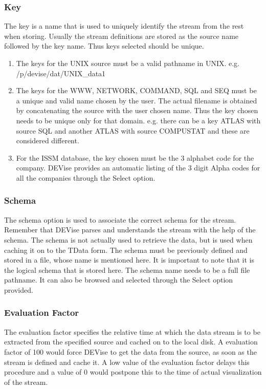 \subsubsection{Key}

The key is a name that is used to uniquely identify the stream from the rest
when storing. Usually the stream definitions are stored as the source name
followed by the key name. Thus keys selected should be unique.

\begin{enumerate}
\item
The keys for the UNIX source must be a valid pathname in UNIX.
e.g. /p/devise/dat/UNIX\_data1

\item
The keys for the WWW, NETWORK, COMMAND, SQL and SEQ must be a unique and valid
name chosen by the user. The actual filename is obtained by concatenating the
source with the user chosen name. Thus the key chosen needs to be unique only
for that domain. e.g. there can be a key ATLAS with source SQL and another ATLAS
with source COMPUSTAT and these are considered different.

\item
For the ISSM database, the key chosen must be the 3 alphabet code for the
company. DEVise provides an automatic listing of the 3 digit Alpha codes for all
the companies through the Select option.
\end{enumerate}

\subsubsection{Schema}

The schema option is used to associate the correct schema for the stream.
Remember that DEVise parses and understands the stream with the help of the
schema. The schema is not actually used to retrieve the data, but is used when
caching it on to the TData form. The schema must be previously defined and
stored in a file, whose name is mentioned here. It is important to note that it
is the logical schema that is stored here. The schema name needs to be a full
file pathname. It can also be browsed and selected through the Select option
provided.

\subsubsection{Evaluation Factor}

The evaluation factor specifies the relative time at which the data stream is to
be extracted from the specified source and cached on to the local disk. A
evaluation factor of 100 would force DEVise to get the data from the source, as
soon as the stream is defined and cache it. A low value of the evaluation factor
delays this procedure and a value of 0 would postpone this to the time of actual
visualization of the stream.

